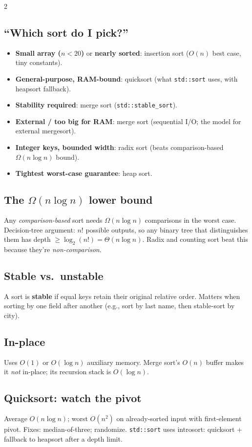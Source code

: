 \documentclass[10pt]{article}
\begin{document}
\begin{multicols}{2}
\subsection*{``Which sort do I pick?''}
\begin{itemize}
    \item \textbf{Small array ($n < 20$)} or \textbf{nearly sorted}:
    insertion sort ($O(n)$ best case, tiny constants).
    \item \textbf{General-purpose, RAM-bound}: quicksort (what
    \texttt{std::sort} uses, with heapsort fallback).
    \item \textbf{Stability required}: merge sort (\texttt{std::stable\_sort}).
    \item \textbf{External / too big for RAM}: merge sort (sequential
    I/O; the model for external mergesort).
    \item \textbf{Integer keys, bounded width}: radix sort (beats
    comparison-based $\Omega(n \log n)$ bound).
    \item \textbf{Tightest worst-case guarantee}: heap sort.
\end{itemize}

\subsection*{The $\Omega(n \log n)$ lower bound}
Any \emph{comparison-based} sort needs $\Omega(n \log n)$ comparisons in
the worst case. Decision-tree argument: $n!$ possible outputs, so any
binary tree that distinguishes them has depth $\geq \log_2(n!) = \Theta(n
\log n)$. Radix and counting sort beat this because they're
\emph{non-comparison}.

\subsection*{Stable vs.\ unstable}
A sort is \textbf{stable} if equal keys retain their original relative
order. Matters when sorting by one field after another (e.g., sort by
last name, then stable-sort by city).

\subsection*{In-place}
Uses $O(1)$ or $O(\log n)$ auxiliary memory. Merge sort's $O(n)$ buffer
makes it \emph{not} in-place; its recursion stack is $O(\log n)$.

\subsection*{Quicksort: watch the pivot}
Average $O(n \log n)$; worst $O(n^2)$ on already-sorted input with
first-element pivot. Fixes: median-of-three; randomize. \texttt{std::sort}
uses introsort: quicksort + fallback to heapsort after a depth limit.


\end{multicols}
\end{document}
